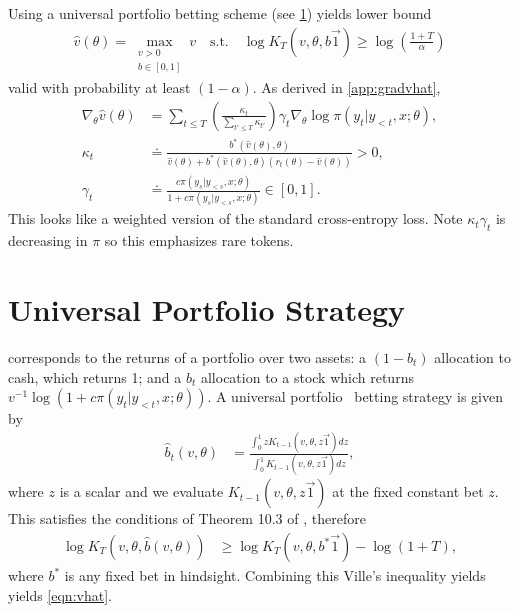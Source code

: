 \documentclass{article}
\begin{document}
Using a universal portfolio betting scheme (see \cref{app:universal}) yields lower bound
\begin{align}
\hat{v}(\theta) = \max_{\substack{v > 0 \\ b \in [0, 1]}} v \quad \text{s.t.} \quad \log K_T(v, \theta, b \vec{1}) \geq \log\left(\frac{1+T}{\alpha}\right) \label{eqn:vhat}
\end{align}
valid with probability at least $(1 - \alpha)$.  As derived in \cref{app:gradvhat},
\begin{align}
\nabla_\theta \hat{v}(\theta) &= \sum_{t \leq T} \left(\frac{\kappa_t}{\sum_{t' \leq T} \kappa_{t'}}\right) \gamma_t \nabla_\theta \log \pi\left(y_t|y_{<t},x;\theta\right),
 \label{eqn:gradvhat} \\
\kappa_t &\doteq \frac{b^*(\hat{v}(\theta), \theta)}{\hat{v}(\theta) + b^*(\hat{v}(\theta), \theta) \left(r_t(\theta) - \hat{v}(\theta) \right)} > 0, \label{eqn:kappa} \\
\gamma_t &\doteq \frac{c \pi\left(y_s|y_{<s},x;\theta\right)}{1 + c \pi\left(y_s|y_{<s},x;\theta\right)} \in [0, 1].
\end{align}
This looks like a weighted version of the standard cross-entropy loss.  Note $\kappa_t \gamma_t$ is decreasing in $\pi$ so this emphasizes rare tokens.

\appendix


\section{Universal Portfolio Strategy} \label{app:universal}

 corresponds to the returns of a
portfolio over two assets: a $(1 - b_t)$ allocation to cash, which returns 1;
and a $b_t$ allocation to a stock which returns $v^{-1} \log(1 + c \pi(y_t|y_{<t},x;\theta))$.
A universal portfolio~\parencite{cover1991universal} betting strategy is given by
\begin{align*}
\hat{b}_t(v, \theta) &= \frac{\int_0^1 z K_{t-1}(v, \theta, z \vec{1}) dz}{\int_0^1 K_{t-1}(v, \theta, z \vec{1}) dz},
\end{align*}
where $z$ is a scalar and we evaluate $K_{t-1}(v, \theta, z \vec{1})$ at
the fixed constant bet $z$. This satisfies the conditions of Theorem 10.3 of
\textcite{cesa2006prediction}, therefore
\begin{align*}
\log K_T\left(v, \theta, \hat{b}(v, \theta)\right) &\geq \log K_T\left(v, \theta, b^* \vec{1}\right) - \log(1 + T),
\end{align*}
where $b^*$ is any fixed bet in hindsight. Combining this Ville's inequality yields yields \cref{eqn:vhat}.
\end{document}
